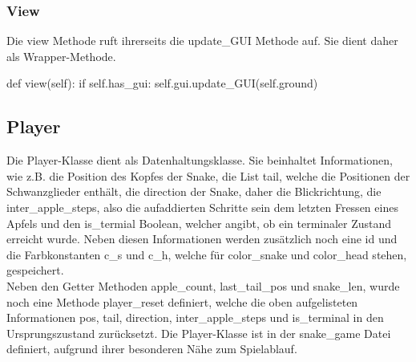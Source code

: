 \subsubsection{View} \label{sec:Implementierung-View}
Die view Methode ruft ihrerseits die update\_GUI Methode auf. Sie dient daher als Wrapper-Methode.
\begin{python}
	def view(self):
		if self.has_gui:
			self.gui.update_GUI(self.ground)
\end{python}


\subsection{Player} \label{sec:Implementierung_Player}
Die Player-Klasse dient als Datenhaltungsklasse. Sie beinhaltet Informationen, wie z.B. die Position des Kopfes der Snake, die List tail, welche die Positionen der Schwanzglieder enthält, die direction der Snake, daher die Blickrichtung, die inter\_apple\_steps, also die aufaddierten Schritte sein dem letzten Fressen eines Apfels und den is\_termial Boolean, welcher angibt, ob ein terminaler Zustand erreicht wurde. Neben diesen Informationen werden zusätzlich noch eine id und die Farbkonstanten c\_s und c\_h, welche für color\_snake und color\_head stehen, gespeichert.\\
Neben den Getter Methoden apple\_count, last\_tail\_pos und snake\_len, wurde noch eine Methode player\_reset definiert, welche die oben aufgelisteten Informationen pos, tail, direction, inter\_apple\_steps und is\_terminal in den Ursprungszustand zurücksetzt.
Die Player-Klasse ist in der snake\_game Datei definiert, aufgrund ihrer besonderen Nähe zum Spielablauf.


